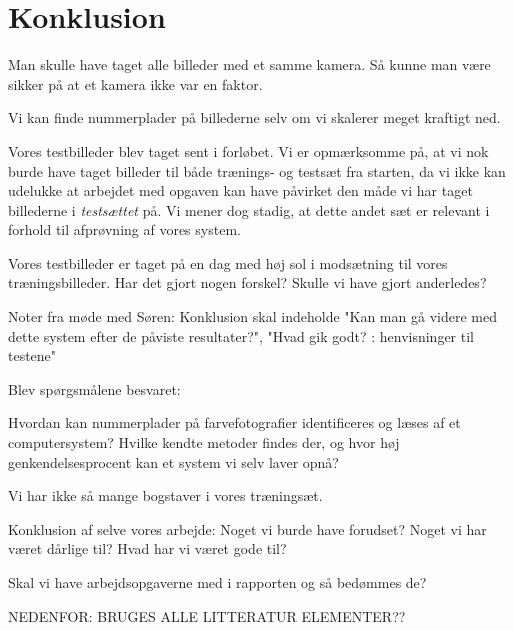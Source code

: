 \documentclass[11pt,a4paper,final]{article}
\begin{document}
\section{Konklusion}
\label{sec:konklusion}
Man skulle have taget alle billeder med et samme kamera. Så kunne man være sikker på at et kamera ikke var en faktor.

Vi kan finde nummerplader på billederne selv om vi skalerer meget kraftigt ned.

Vores testbilleder blev taget sent i forløbet. Vi er opmærksomme på, at vi nok burde have taget  billeder til både trænings- og testsæt fra starten, da vi ikke kan udelukke at arbejdet med opgaven kan have påvirket den måde vi har taget billederne i \textit{testsættet} på. Vi mener dog stadig, at dette andet sæt er relevant i forhold til afprøvning af vores system.

Vores testbilleder er taget på en dag med høj sol i modsætning til vores træningsbilleder. Har det gjort nogen forskel? Skulle vi have gjort anderledes?

Noter fra møde med Søren: Konklusion skal indeholde "Kan man gå videre med dette system efter de påviste resultater?", "Hvad gik godt? : henvisninger til testene"

Blev spørgsmålene besvaret:

Hvordan kan nummerplader på farvefotografier identificeres og læses af et computersystem? Hvilke kendte metoder findes der, og hvor høj genkendelsesprocent kan et system vi selv laver opnå?

Vi har ikke så mange bogstaver i vores træningsæt.

Konklusion af selve vores arbejde: Noget vi burde have forudset? Noget vi har været dårlige til? Hvad har vi været gode til?

Skal vi have arbejdsopgaverne med i rapporten og så bedømmes de?

NEDENFOR: BRUGES ALLE LITTERATUR ELEMENTER??


\newpage %
%
\end{document}
